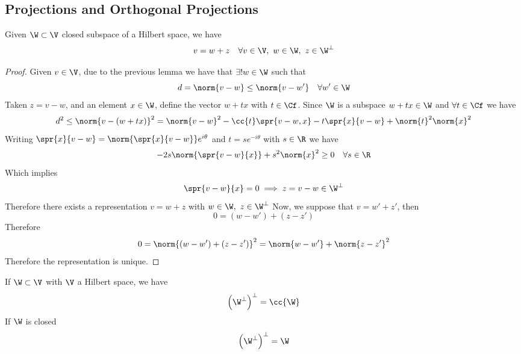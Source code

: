 \documentclass[../mmf.tex]{subfiles}
\begin{document}
\subsection{Projections and Orthogonal Projections}
\begin{thm}[Projection]
	Given $\W\subset\V$ closed subspace of a Hilbert space, we have
	\begin{equation*}
		v=w+z\quad\forall v\in\V,\ w\in\W,\ z\in\W^\perp
	\end{equation*}
\end{thm}
\begin{proof}
	Given $v\in\V$, due to the previous lemma we have that $\exists!w\in\W$ such that
	\begin{equation*}
		d=\norm{v-w}\le\norm{v-w'}\quad\forall w'\in\W
	\end{equation*}
	Taken $z=v-w$, and an element $x\in\W$, define the vector $w+tx$ with $t\in\Cf$. Since $\W$ is a subspace $w+tx\in\W$ and $\forall t\in\Cf$ we have
	\begin{equation*}
		d^2\le\norm{v-(w+tx)}^2=\norm{v-w}^2-\cc{t}\spr{v-w,x}-t\spr{x}{v-w}+\norm{t}^2\norm{x}^2
	\end{equation*}
	Writing $\spr{x}{v-w}=\norm{\spr{x}{v-w}}e^{i\theta}$ and $t=se^{-i\theta}$ with $s\in\R$ we have
	\begin{equation*}
		-2s\norm{\spr{v-w}{x}}+s^2\norm{x}^2\ge0\quad\forall s\in\R
	\end{equation*}
	Which implies
	\begin{equation*}
		\spr{v-w}{x}=0\implies z=v-w\in\W^\perp
	\end{equation*}
	Therefore there exists a representation $v=w+z$ with $w\in\W,\ z\in\W^\perp$
	Now, we suppose that $v=w'+z'$, then
	\begin{equation*}
		0=(w-w')+(z-z')
	\end{equation*}
	Therefore
	\begin{equation*}
		0=\norm{(w-w')+(z-z')}^2=\norm{w-w'}+\norm{z-z'}^2
	\end{equation*}
	Therefore the representation is unique.
\end{proof}
\begin{thm}
	If $\W\subset\V$ with $\V$ a Hilbert space, we have
	\begin{equation*}
		\left( \W^\perp \right)^\perp=\cc{\W}
	\end{equation*}
	If $\W$ is closed
	\begin{equation*}
		\left( \W^\perp \right)^\perp=\W
	\end{equation*}
\end{thm}
\end{document}
